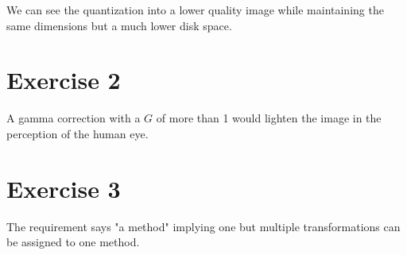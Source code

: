 \documentclass[12pt, a4paper]{article}
\begin{document}
\begin{multicols}{2}

    \begin{table}[H]
        \caption{Comparison of Images}\label{tab:comp}
        \begin{center}
        \end{center}
    \end{table}

    We can see the quantization into a lower quality image while maintaining the same dimensions but a much lower disk space.
    \newline

    \section{Exercise 2} \label{sec:ex2}

    A gamma correction with a $G$ of more than 1 would lighten the image in the perception of the human eye.
    \newline

    \section{Exercise 3} \label{sec:ex3}

    The requirement says "a method" implying one but multiple transformations can be assigned to one method.
    \newline


\end{multicols}
\end{document}
